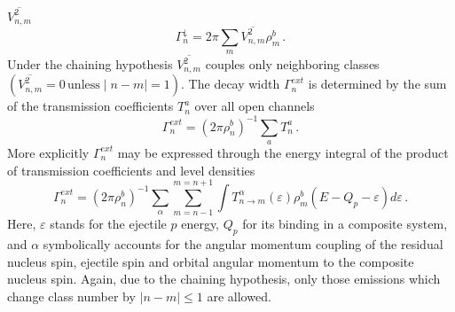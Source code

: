 $\overline{V_{n,m}^{2}}$
\begin{equation}
\Gamma_{n}^{\downarrow}=2\pi\sum_{m}\overline{V_{n,m}^{2}}\rho_{m}^{b}\,.
\label{GdownMSC}
\end{equation}
Under the chaining hypothesis $\overline{V_{n,m}^{2}}$ couples only
neighboring classes $(\overline{V_{n,m}^{2}}=0\,{\text{unless}}\mid
n-m\mid=1)$. The decay width $\Gamma_{n}^{ext}$ is determined by the sum of
the transmission coefficients $T_{n}^{a}$ over all open channels
\begin{equation}
\Gamma_{n}^{ext}=(2\pi\rho_{n}^{b})^{-1}\sum_{a}T_{n}^{a}\,.
\end{equation}
More explicitly $\Gamma_{n}^{ext}$ may be expressed through the energy
integral of the product of transmission coefficients and level densities%
\begin{equation}
\Gamma_{n}^{ext}=(2\pi\rho_{n}^{b})^{-1}\sum_{\alpha}\sum_{m=n-1}^{m=n+1}%
\int T_{n\rightarrow
m}^{\alpha}(\varepsilon)\rho_{m}^{b}(E-Q_{p}-\varepsilon)d\varepsilon\,.
\label{Gammext}
\end{equation}
Here, $\varepsilon$ stands for the ejectile $p$ energy, $Q_{p}$ for its
binding in a composite system, and $\alpha$ symbolically accounts for the
angular momentum coupling of the residual nucleus spin, ejectile spin and
orbital angular momentum to the composite nucleus spin. Again, due to the
chaining hypothesis, only those emissions which change class number by $\mid
n-m\mid\leq1$ are allowed.

